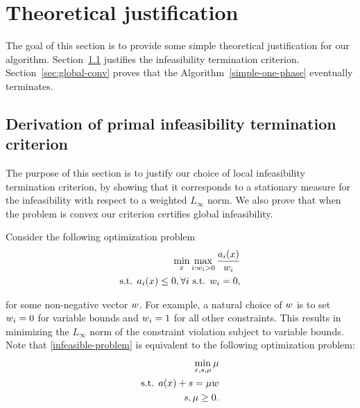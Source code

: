 \documentclass{article}
\begin{document}
\section{Theoretical justification}\label{sec:theory}

The goal of this section is to provide some simple theoretical justification for our algorithm. Section~\ref{sec:infeas-criteron-justify} justifies the infeasibility termination criterion. Section~\ref{sec:global-conv} proves that the Algorithm~\ref{simple-one-phase} eventually terminates. 

\subsection{Derivation of primal infeasibility termination criterion} \label{sec:infeas-criteron-justify}

The purpose of this section is to justify our choice of local infeasibility termination criterion, by showing that it corresponds to a stationary measure for the infeasibility with respect to a weighted $L_{\infty}$ norm. We also prove that when the problem is convex our criterion certifies global infeasibility.

Consider the following optimization problem
\begin{subequations}\label{infeasible-problem}
\begin{flalign}
\min_{x} \max_{i : w_i > 0}{ \frac{a_i(x)}{ w_i }  }  \\
\text{s.t. } a_i(x) \le 0, \forall i \text{ s.t. } w_i = 0,
\end{flalign}
\end{subequations}

for some non-negative vector $w$. For example, a natural choice of $w$ is to set $w_i = 0$ for variable bounds and $w_i = 1$ for all other constraints. This results in minimizing the $L_{\infty}$ norm of the constraint violation subject to variable bounds. Note that \eqref{infeasible-problem} is equivalent to the following optimization problem:
\begin{subequations}\label{feas-problem}
\begin{flalign}
\min_{x,s,\mu} \mu \\
\text{s.t. } a(x) + s = \mu w \\
s, \mu \ge 0.
\end{flalign}
\end{subequations}
\end{document}
